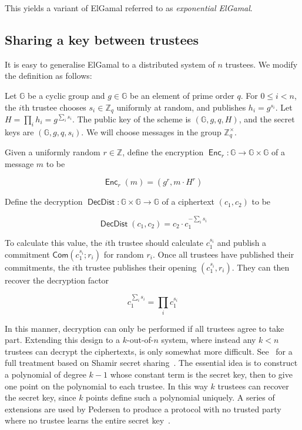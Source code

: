 \documentclass[12pt,a4paper]{article}
\DeclareMathOperator{\Enc}{\mathsf{Enc}}
\DeclareMathOperator{\DecDist}{\mathsf{DecDist}}
\newcommand{\commit}{\mathsf{Com}}
\theoremstyle{definition}
\begin{document}
This yields a variant of ElGamal referred to as \textit{exponential ElGamal}.
\subsection{Sharing a key between trustees}
It is easy to generalise ElGamal to a distributed system of $n$ trustees. We modify the definition as follows:
\begin{definition}
    Let $\mathbb{G}$ be a cyclic group and $g\in\mathbb{G}$ be an element of prime order $q$. For $0\leq i<n$, the $i$th trustee chooses $s_i\in\mathbb{Z}_q$ uniformly at random, and publishes $h_i=g^{s_i}$. Let $H=\prod_i h_i=g^{\sum_i s_i}$. The public key of the scheme is $(\mathbb{G}, g, q, H)$, and the secret keys are $(\mathbb{G}, g, q, s_i)$. We will choose messages in the group $\mathbb{Z}^\times_q$.

    Given a uniformly random $r\in\mathbb{Z}$, define the encryption $\Enc_r:\mathbb{G}\rightarrow\mathbb{G}\times\mathbb{G}$ of a message $m$ to be
    
    $$\Enc_r(m) = (g^r, m\cdot H^r)$$

    Define the decryption $\DecDist:\mathbb{G}\times\mathbb{G}\rightarrow \mathbb{G}$ of a ciphertext $(c_1, c_2)$ to be
    
    $$\DecDist(c_1,c_2)=c_2\cdot c_1^{-\sum_i s_i}$$
    
    To calculate this value, the $i$th trustee should calculate $c_1^{s_i}$ and publish a commitment $\commit\left(c_1^{s_i};r_i\right)$ for random $r_i$. Once all trustees have published their commitments, the $i$th trustee publishes their opening $\left(c_1^{s_i}, r_i\right)$. They can then recover the decryption factor
    
    $$c_1^{\sum_i s_i}=\prod_i{c_1^{s_i}}$$
\end{definition}
In this manner, decryption can only be performed if all trustees agree to take part. Extending this design to a $k$-out-of-$n$ system, where instead any $k<n$ trustees can decrypt the ciphertexts, is only somewhat more difficult. See~\cite{pedersen1991threshold} for a full treatment based on Shamir secret sharing~\cite{shamir1979share}. The essential idea is to construct a polynomial of degree $k-1$ whose constant term is the secret key, then to give one point on the polynomial to each trustee. In this way $k$ trustees can recover the secret key, since $k$ points define such a polynomial uniquely. A series of extensions are used by Pedersen to produce a protocol with no trusted party where no trustee learns the entire secret key~\cite{pedersen1991threshold}.
\end{document}
